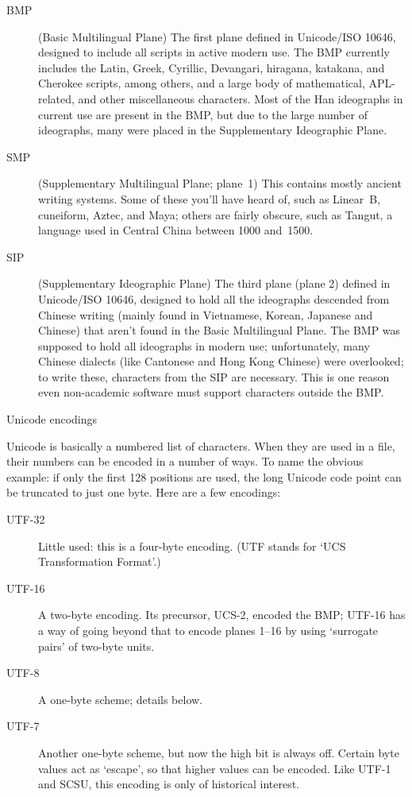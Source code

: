 \begin{description}
\item[BMP] (Basic Multilingual Plane) The first plane defined in
  Unicode/ISO 10646, designed to include all scripts in active modern
  use. The BMP currently includes the Latin, Greek, Cyrillic,
  Devangari, hiragana, katakana, and Cherokee scripts, among others,
  and a large body of mathematical, APL-related, and other
  miscellaneous characters. Most of the Han ideographs in current use
  are present in the BMP, but due to the large number of ideographs,
  many were placed in the Supplementary Ideographic Plane.
\item[SMP] (Supplementary Multilingual Plane; plane~1) This contains
  mostly ancient writing systems. Some of these you'll have heard of,
  such as Linear~B, cuneiform, Aztec, and Maya; others are fairly
  obscure, such as Tangut, a language used in Central China between
  1000 and~1500.
\item[SIP] (Supplementary Ideographic Plane) The third plane (plane 2)
  defined in Unicode/ISO 10646, designed to hold all the ideographs
  descended from Chinese writing (mainly found in Vietnamese, Korean,
  Japanese and Chinese) that aren't found in the Basic Multilingual
  Plane. The BMP was supposed to hold all ideographs in modern use;
  unfortunately, many Chinese dialects (like Cantonese and Hong Kong
  Chinese) were overlooked; to write these, characters from the SIP
  are necessary. This is one reason even non-academic software must
  support characters outside the BMP.
\end{description}

 {Unicode encodings}
\label{sec:uni-encoding}

Unicode is basically a numbered list of characters. When they are used
in a file, their numbers can be encoded in a number of ways. To name
the obvious example: if only the first 128 positions are used, the
long Unicode code point can be truncated to just one byte. Here are a
few encodings:
\begin{description}
\item[UTF-32] Little used: this is a four-byte encoding. (UTF stands
  for `UCS Transformation Format'.)
\item[UTF-16] A two-byte encoding. Its precursor, UCS-2, encoded the
  BMP; UTF-16 has a way of going beyond that to encode planes 1--16
  by using `surrogate pairs' of two-byte units.
\item[UTF-8] A one-byte scheme; details below.
\item[UTF-7] Another one-byte scheme, but now the high bit is always
  off. Certain byte values act as `escape', so that higher values can
  be encoded. Like UTF-1 and SCSU, this encoding is only of historical
  interest.
\end{description}

